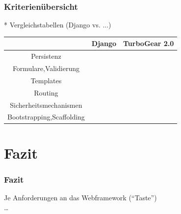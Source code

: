 \documentclass[
    t,
    smaller,
    compress,
    xcolor=svgnames,            %
    table,
]{beamer}
\begin{document}
\begin{frame}
  \frametitle{Kriterienübersicht}
 * Vergleichstabellen (Django vs. ...)

    \begin{table}[h]
        \begin{tabular}{|c|c|c|}
            \hline
             & Django & TurboGear 2.0  \\ \hline
            Persistenz &   &      \\ \hline
            Formulare,Validierung &   &      \\ \hline
            Templates &   &      \\ \hline
            Routing &   &      \\ \hline
            Sicherheitsmechanismen &   &      \\ \hline
            Bootstrapping,Scaffolding &   &      \\ \hline

         \end{tabular}
    \end{table}

\end{frame}


\section{Fazit}
\begin{frame}
  \frametitle{Fazit}

  Je Anforderungen an das Webframework (“Taste”)\\
  \dots

\end{frame}
\end{document}
